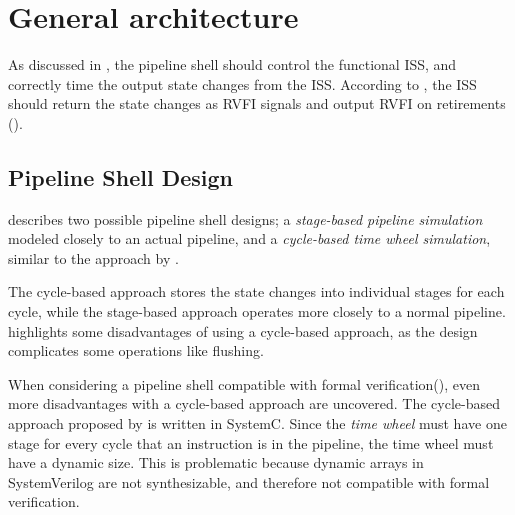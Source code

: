 
\section{General architecture}

As discussed in , the pipeline shell should control the functional ISS, and correctly time the output state changes from the ISS. According to , the ISS should return the state changes as RVFI signals and output RVFI on retirements ().


\subsection{Pipeline Shell Design}

 describes two possible pipeline shell designs; a \textit{stage-based pipeline simulation} modeled closely to an actual pipeline, and a \textit{cycle-based time wheel simulation}, similar to the approach by \textcite{chiangEfficientTwolayeredCycleaccurate2009}. 

The cycle-based approach stores the state changes into individual stages for each cycle, while the stage-based approach operates more closely to a normal pipeline.
 highlights some disadvantages of using a cycle-based approach, as the design complicates some operations like flushing. 

When considering a pipeline shell compatible with formal verification(), even more disadvantages with a cycle-based approach are uncovered. The cycle-based approach proposed by \textcite{chiangEfficientTwolayeredCycleaccurate2009} is written in SystemC. Since the \textit{time wheel} must have one stage for every cycle that an instruction is in the pipeline, the time wheel must have a dynamic size. This is problematic because dynamic arrays in SystemVerilog are not synthesizable\cite{mehtaIntroductionSystemVerilog2021}, and therefore not compatible with formal verification\cite{seligmanFormalVerificationEssential2015}.


